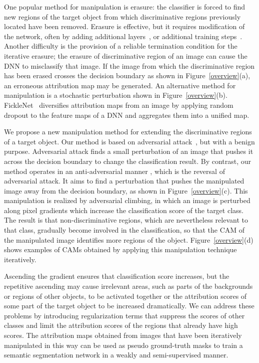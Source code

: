 \documentclass[final]{cvpr}
\begin{document}
One popular method for manipulation is erasure: the classifier is forced to find new regions of the target object from which discriminative regions previously located have been removed.
Erasure is effective, but it requires modification of the network, often by adding additional layers~\cite{hou2018self, zhang2018adversarial}, or additional training steps~\cite{wei2017object}.
Another difficulty is the provision of a reliable termination condition for the iterative erasure; the erasure of discriminative region of an image can cause the DNN to misclassify that image.
If the image from which the discriminative region has been erased crosses the decision boundary as shown in Figure~\ref{overview}(a), an erroneous attribution map may be generated.
An alternative method for manipulation is a stochastic perturbation shown in Figure~\ref{overview}(b). 
FickleNet~\cite{lee2019ficklenet} diversifies attribution maps from an image by applying random dropout to the feature maps of a DNN and aggregates them into a unified map. 



We propose a new manipulation method for extending the discriminative regions of a target object.
Our method is based on adversarial attack~\cite{goodfellow2014explaining, kurakin2016adversarial}, but with a benign purpose. Adversarial attack finds a small perturbation of an image that pushes it across the decision boundary to change the classification result.
By contrast, our method operates in an anti-adversarial manner , which is the reversal of adversarial attack.
It aims to find a perturbation that pushes the manipulated image away from the decision boundary, as shown in Figure~\ref{overview}(c).
This manipulation is realized by adversarial climbing, in which an image is perturbed along pixel gradients which increase the classification score of the target class.
The result is that non-discriminative regions, which are nevertheless relevant to that class, gradually become involved in the classification, so that the CAM of the manipulated image identifies more regions of the object. Figure~\ref{overview}(d) shows examples of CAMs obtained by applying this manipulation technique iteratively.


Ascending the gradient ensures that classification score increases, but the repetitive ascending may cause irrelevant areas, such as parts of the backgrounds or regions of other objects, to be activated together or the attribution scores of some part of the target object to be increased dramatically.
We can address these problems by introducing regularization terms that suppress the scores of other classes and limit the attribution scores of the regions that already have high scores. 
The attribution maps obtained from images that have been iteratively manipulated in this way can be used as pseudo ground-truth masks to train a semantic segmentation network in a weakly and semi-supervised manner.
\end{document}
